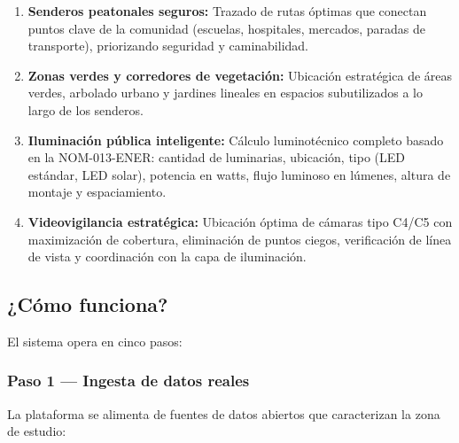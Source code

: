 \documentclass[12pt,a4paper]{article}
\begin{document}
\begin{enumerate}[label=\textbf{\arabic*.}]
    \item \textbf{Senderos peatonales seguros:} Trazado de rutas óptimas que conectan puntos clave de la comunidad (escuelas, hospitales, mercados, paradas de transporte), priorizando seguridad y caminabilidad.
    
    \item \textbf{Zonas verdes y corredores de vegetación:} Ubicación estratégica de áreas verdes, arbolado urbano y jardines lineales en espacios subutilizados a lo largo de los senderos.
    
    \item \textbf{Iluminación pública inteligente:} Cálculo luminotécnico completo basado en la NOM-013-ENER: cantidad de luminarias, ubicación, tipo (LED estándar, LED solar), potencia en watts, flujo luminoso en lúmenes, altura de montaje y espaciamiento.
    
    \item \textbf{Videovigilancia estratégica:} Ubicación óptima de cámaras tipo C4/C5 con maximización de cobertura, eliminación de puntos ciegos, verificación de línea de vista y coordinación con la capa de iluminación.
\end{enumerate}

\subsection{¿Cómo funciona?}

El sistema opera en cinco pasos:

\subsubsection{Paso 1 — Ingesta de datos reales}

La plataforma se alimenta de fuentes de datos abiertos que caracterizan la zona de estudio:
\end{document}
